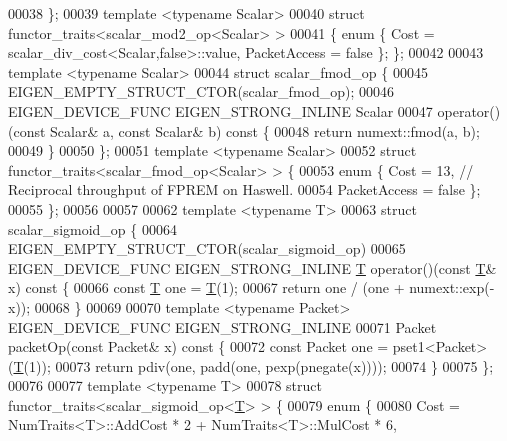 \begin{DoxyCode}
00038 \};
00039 \textcolor{keyword}{template} <\textcolor{keyword}{typename} Scalar>
00040 \textcolor{keyword}{struct }functor\_traits<scalar\_mod2\_op<Scalar> >
00041 \{ \textcolor{keyword}{enum} \{ Cost = scalar\_div\_cost<Scalar,false>::value, PacketAccess = \textcolor{keyword}{false} \}; \};
00042 
00043 \textcolor{keyword}{template} <\textcolor{keyword}{typename} Scalar>
00044 \textcolor{keyword}{struct }scalar\_fmod\_op \{
00045   EIGEN\_EMPTY\_STRUCT\_CTOR(scalar\_fmod\_op);
00046   EIGEN\_DEVICE\_FUNC EIGEN\_STRONG\_INLINE Scalar
00047   operator()(\textcolor{keyword}{const} Scalar& a, \textcolor{keyword}{const} Scalar& b)\textcolor{keyword}{ const }\{
00048     \textcolor{keywordflow}{return} numext::fmod(a, b);
00049   \}
00050 \};
00051 \textcolor{keyword}{template} <\textcolor{keyword}{typename} Scalar>
00052 \textcolor{keyword}{struct }functor\_traits<scalar\_fmod\_op<Scalar> > \{
00053   \textcolor{keyword}{enum} \{ Cost = 13,  \textcolor{comment}{// Reciprocal throughput of FPREM on Haswell.}
00054          PacketAccess = \textcolor{keyword}{false} \};
00055 \};
00056 
00057 
00062 \textcolor{keyword}{template} <\textcolor{keyword}{typename} T>
00063 \textcolor{keyword}{struct }scalar\_sigmoid\_op \{
00064   EIGEN\_EMPTY\_STRUCT\_CTOR(scalar\_sigmoid\_op)
00065   EIGEN\_DEVICE\_FUNC EIGEN\_STRONG\_INLINE \hyperlink{group___sparse_core___module_class_eigen_1_1_triplet}{T} operator()(\textcolor{keyword}{const} \hyperlink{group___sparse_core___module_class_eigen_1_1_triplet}{T}& x)\textcolor{keyword}{ const }\{
00066     \textcolor{keyword}{const} \hyperlink{group___sparse_core___module_class_eigen_1_1_triplet}{T} one = \hyperlink{group___sparse_core___module_class_eigen_1_1_triplet}{T}(1);
00067     \textcolor{keywordflow}{return} one / (one + numext::exp(-x));
00068   \}
00069 
00070   \textcolor{keyword}{template} <\textcolor{keyword}{typename} Packet> EIGEN\_DEVICE\_FUNC EIGEN\_STRONG\_INLINE
00071   Packet packetOp(\textcolor{keyword}{const} Packet& x)\textcolor{keyword}{ const }\{
00072     \textcolor{keyword}{const} Packet one = pset1<Packet>(\hyperlink{group___sparse_core___module_class_eigen_1_1_triplet}{T}(1));
00073     \textcolor{keywordflow}{return} pdiv(one, padd(one, pexp(pnegate(x))));
00074   \}
00075 \};
00076 
00077 \textcolor{keyword}{template} <\textcolor{keyword}{typename} T>
00078 \textcolor{keyword}{struct }functor\_traits<scalar\_sigmoid\_op<\hyperlink{group___sparse_core___module_class_eigen_1_1_triplet}{T}> > \{
00079   \textcolor{keyword}{enum} \{
00080     Cost = NumTraits<T>::AddCost * 2 + NumTraits<T>::MulCost * 6,

\end{DoxyCode}
